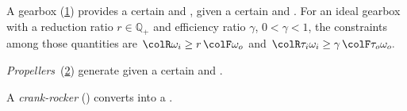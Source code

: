 \begin{example}
A gearbox (\cref{fig:gearbox}) provides a certain  and , given a certain
 and . For
an ideal gearbox with a reduction ratio $r \in \mathbb{Q}_+$ and
efficiency ratio $\gamma$, $0<\gamma<1$, the constraints among
those quantities are ${\colR \omega_i}\geq r\,{\colF \omega_o}$
and ${\colR \tau_i\omega_i}\geq\gamma\,{\colF \tau_o\omega_o}.$
\end{example}

\begin{figure}[h]
\begin{center}
\end{center}
\caption{\label{fig:gearbox}}
\end{figure}


\begin{example}
\emph{Propellers}~(\cref{fig:propeller}) generate 
given a certain  and .
\end{example}

\begin{figure}[h]
\begin{center}
\end{center}
\caption{\label{fig:propeller}}
\end{figure}

\begin{example}
A \emph{crank-rocker} () converts  into a .
\end{example}

\begin{figure}[h]
    \centering
\caption{\label{fig:crack}}
\end{figure}



